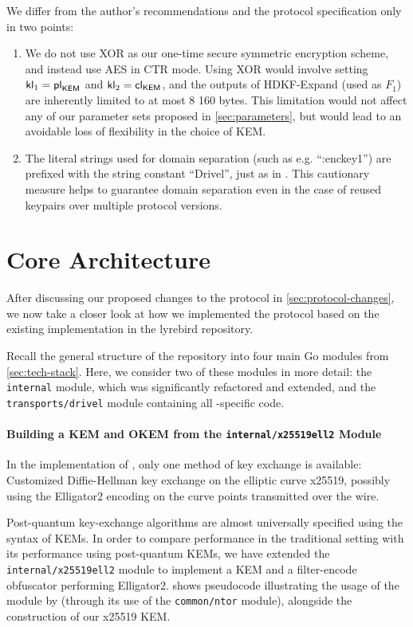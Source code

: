 We differ from the author's recommendations and the protocol specification only in two points:
\begin{enumerate}
    \item We do not use XOR as our one-time secure symmetric encryption scheme, and instead use AES in CTR mode. Using XOR would involve setting $\mathsf{kl}_1 = {\mathsf{pl}_{\mathsf{KEM}}}$ and $\mathsf{kl}_2 = {\mathsf{cl}_{\mathsf{KEM}}}$, and the outputs of \textsf{HDKF-Expand} (used as $F_1$) are inherently limited to at most 8 160 bytes. This limitation would not affect any of our parameter sets proposed in \cref{sec:parameters}, but would lead to an avoidable loss of flexibility in the choice of KEM.

    \item The literal strings used for domain separation (such as e.g. ``:enckey1'') are prefixed with the string constant ``Drivel'', just as in \obfsfour{}. This cautionary measure helps to guarantee domain separation even in the case of reused keypairs over multiple protocol versions.
\end{enumerate}

\section{Core Architecture} \label{sec:impl-architecture}

After discussing our proposed changes to the \drivel{} protocol in \cref{sec:protocol-changes}, we now take a closer look at how we implemented the \drivel{} protocol based on the existing \obfsfour{} implementation in the lyrebird repository.

Recall the general structure of the repository into four main Go modules from \cref{sec:tech-stack}. Here, we consider two of these modules in more detail: the \texttt{internal} module, which was significantly refactored and extended, and the \texttt{transports/drivel} module containing all \drivel{}-specific code.

\paragraph{Building a KEM and OKEM from the \texttt{internal/x25519ell2} Module}

In the implementation of \obfsfour{}, only one method of key exchange is available: Customized Diffie-Hellman key exchange on the elliptic curve x25519, possibly using the \textsf{Elligator2} encoding on the curve points transmitted over the wire.

Post-quantum key-exchange algorithms are almost universally specified using the syntax of KEMs. In order to compare \drivel{} performance in the traditional setting with its performance using post-quantum KEMs, we have extended the \texttt{internal/x25519ell2} module to implement a KEM and a filter-encode obfuscator performing \textsf{Elligator2}.  shows pseudocode illustrating the usage of the module by \obfsfour{} (through its use of the \texttt{common/ntor} module), alongside the construction of our x25519 KEM.

